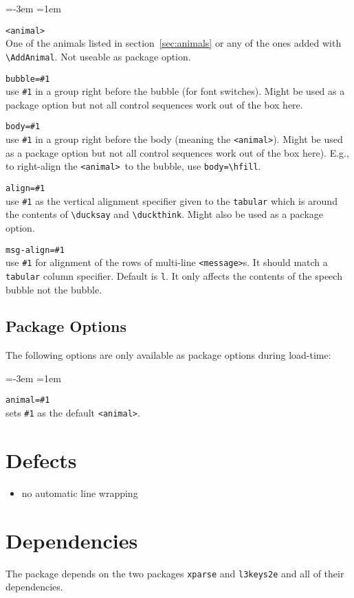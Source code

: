 \documentclass[]{article}
\newcommand*{\anml}{\texttt{<animal>}}
\newcommand*{\msg}{\texttt{<message>}}
\newenvironment{codedescription}{%
  \parindent=-3em%
  \parskip=1em%
  \par%
}{}
\begin{document}
\begin{codedescription}
\anml\\
  One of the animals listed in section~\ref{sec:animals} or any of the ones
  added with \verb|\AddAnimal|. Not useable as package option.

\texttt{bubble=\#1}\\
  use \texttt{\#1} in a group right before the bubble (for font switches). Might
  be used as a package option but not all control sequences work out of the box
  here.

\texttt{body=\#1}\\
  use \texttt{\#1} in a group right before the body (meaning the \anml). Might
  be used as a package option but not all control sequences work out of the box
  here). E.g., to right-align the \anml\ to the bubble, use \verb|body=\hfill|.

\texttt{align=\#1}\\
  use \texttt{\#1} as the vertical alignment specifier given to the
  \texttt{tabular} which is around the contents of \verb|\ducksay| and
  \verb|\duckthink|. Might also be used as a package option.

\texttt{msg-align=\#1}\\
  use \texttt{\#1} for alignment of the rows of multi-line \msg s. It should
  match a \texttt{tabular} column specifier. Default is \texttt{l}. It only
  affects the contents of the speech bubble not the bubble.
\end{codedescription}
\subsection{Package Options}%
The following options are only available as package options during load-time:

\begin{codedescription}
\texttt{animal=\#1}\\
  sets \texttt{\#1} as the default \anml.
\end{codedescription}
\section{Defects}%
{\reversemarginpar{}}
\begin{itemize}
  \item no automatic line wrapping
\end{itemize}
\section{Dependencies}%
The package depends on the two packages \texttt{xparse} and \texttt{l3keys2e}
and all of their dependencies.
\end{document}
